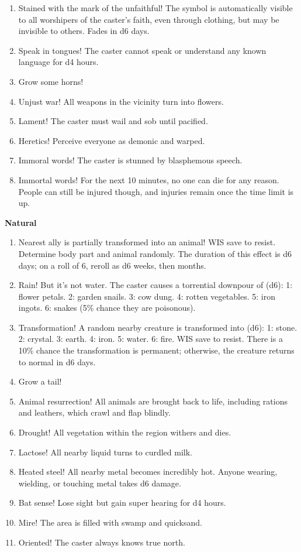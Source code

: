 \documentclass[twoside]{article}
\begin{document}
\begin{enumerate}[nosep]
\item Stained with the mark of the unfaithful! The symbol is automatically visible to all worshipers of the caster's faith, even through clothing, but may be invisible to others. Fades in d6 days.
\item Speak in tongues! The caster cannot speak or understand any known language for d4 hours.
\item Grow some horns!
\item Unjust war! All weapons in the vicinity turn into flowers.
\item Lament! The caster must wail and sob until pacified.
\item Heretics! Perceive everyone as demonic and warped.
\item Immoral words! The caster is stunned by blasphemous speech. 
\item Immortal words! For the next 10 minutes, no one can die for any reason. People can still be injured though, and injuries remain once the time limit is up.
\end{enumerate}

\bigbreak

\textbf{Natural}

\begin{enumerate}[nosep]
\item Nearest ally is partially transformed into an animal! WIS save to resist. Determine body part and animal randomly. The duration of this effect is d6 days; on a roll of 6, reroll as d6 weeks, then months.
\item Rain! But it’s not water. The caster causes a torrential downpour of (d6): 1: flower petals. 2: garden snails. 3: cow dung. 4: rotten vegetables. 5: iron ingots. 6: snakes (5\% chance they are poisonous).
\item Transformation! A random nearby creature is transformed into (d6): 1: stone. 2: crystal. 3: earth. 4: iron. 5: water. 6: fire. WIS save to resist. There is a 10\% chance the transformation is permanent; otherwise, the creature returns to normal in d6 days.
\item Grow a tail!
\item Animal resurrection! All animals are brought back to life, including rations and leathers, which crawl and flap blindly.
\item Drought! All vegetation within the region withers and dies.
\item Lactose! All nearby liquid turns to curdled milk.
\item Heated steel! All nearby metal becomes incredibly hot. Anyone wearing, wielding, or touching metal takes d6 damage.
\item Bat sense! Lose sight but gain super hearing for d4 hours.
\item Mire! The area is filled with swamp and quicksand.
\item Oriented! The caster always knows true north.
\end{enumerate}
\end{document}
